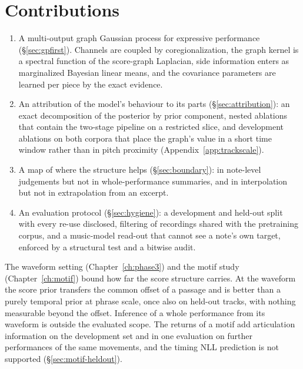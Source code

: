 \documentclass[11pt,a4paper]{report}
\begin{document}
\section{Contributions}
\begin{enumerate}
  \item A multi-output graph Gaussian process for expressive performance
        (\S\ref{sec:gpfirst}). Channels are coupled by coregionalization,
        the graph kernel is a spectral function of the score-graph
        Laplacian, side information enters as marginalized Bayesian linear
        means, and the covariance parameters are learned per piece by the
        exact evidence.
  \item An attribution of the model's behaviour to its parts
        (\S\ref{sec:attribution}): an exact decomposition of the posterior
        by prior component, nested ablations that contain the two-stage
        pipeline on a restricted slice, and development ablations on both
        corpora that place the graph's value in a short time window rather
        than in pitch proximity (Appendix~\ref{app:trackscale}).
  \item A map of where the structure helps (\S\ref{sec:boundary}): in
        note-level judgements but not in whole-performance summaries, and in
        interpolation but not in extrapolation from an excerpt.
  \item An evaluation protocol (\S\ref{sec:hygiene}): a development and
        held-out split with every re-use disclosed, filtering of recordings
        shared with the pretraining corpus, and a music-model read-out that
        cannot see a note's own target, enforced by a structural test and a
        bitwise audit.
\end{enumerate}
The waveform setting (Chapter~\ref{ch:phase3}) and the motif study
(Chapter~\ref{ch:motif}) bound how far the score structure carries. At the
waveform the score prior transfers the common offset of a passage and is
better than a purely temporal prior at phrase scale, once also on held-out
tracks, with nothing measurable beyond the offset. Inference of a whole
performance from its waveform is outside the evaluated scope. The returns of a motif
add articulation information on the development set and in one evaluation
on further performances of the same movements, and the timing NLL
prediction is not supported (\S\ref{sec:motif-heldout}).
\end{document}
